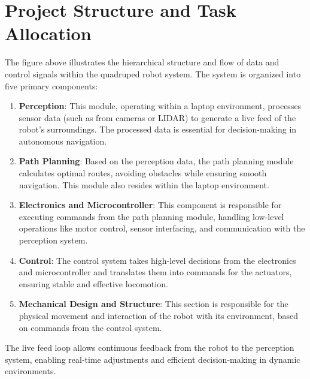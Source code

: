 \documentclass{article}
\begin{document}
\section{Project Structure and Task Allocation}

The figure above illustrates the hierarchical structure and flow of data and control signals within the quadruped robot system. The system is organized into five primary components:

\begin{enumerate}

    \item \textbf{Perception}: This module, operating within a laptop environment, processes sensor data (such as from cameras or LIDAR) to generate a live feed of the robot’s surroundings. The processed data is essential for decision-making in autonomous navigation.
    
    \item \textbf{Path Planning}: Based on the perception data, the path planning module calculates optimal routes, avoiding obstacles while ensuring smooth navigation. This module also resides within the laptop environment.
    
    \item \textbf{Electronics and Microcontroller}: This component is responsible for executing commands from the path planning module, handling low-level operations like motor control, sensor interfacing, and communication with the perception system.
    
    \item \textbf{Control}: The control system takes high-level decisions from the electronics and microcontroller and translates them into commands for the actuators, ensuring stable and effective locomotion.
    
    \item \textbf{Mechanical Design and Structure}: This section is responsible for the physical movement and interaction of the robot with its environment, based on commands from the control system.
\end{enumerate}
    
The live feed loop allows continuous feedback from the robot to the perception system, enabling real-time adjustments and efficient decision-making in dynamic environments.
\end{document}
